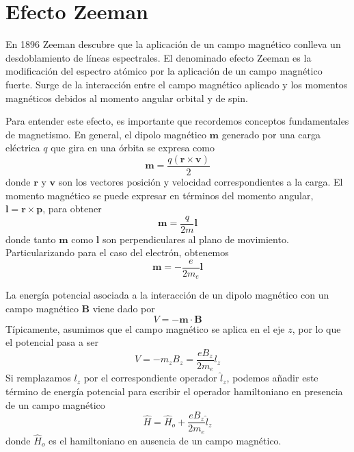 \documentclass{tufte-handout}
\begin{document}

\section{Efecto Zeeman}
En 1896 Zeeman descubre que la aplicación de un campo magnético conlleva un
desdoblamiento de líneas espectrales. El denominado efecto Zeeman es la 
modificación del espectro atómico por la aplicación de un campo magnético
fuerte. Surge de la interacción entre el campo magnético aplicado y los
momentos magnéticos debidos al momento angular orbital y de spin.

Para entender este efecto, es importante
que recordemos conceptos fundamentales de magnetismo. En general, el
dipolo magnético $\mathbf{m}$ generado por una carga eléctrica $q$
que gira en una órbita se expresa como
\begin{equation}
    \mathbf{m}=\frac{q(\mathbf{r}\times\mathbf{v})}{2}
\end{equation}
donde $\mathbf{r}$ y $\mathbf{v}$ son los vectores posición y velocidad
correspondientes a la carga. El momento magnético se puede expresar en
términos del momento angular, $\mathbf{l}=\mathbf{r}\times\mathbf{p}$,
para obtener
\begin{equation}
    \mathbf{m}=\frac{q}{2m}\mathbf{l}
\end{equation}
donde tanto $\mathbf{m}$ como $\mathbf{l}$ son perpendiculares al plano 
de movimiento. Particularizando para el caso del electrón, obtenemos
\begin{equation}
    \mathbf{m}=-\frac{e}{2m_e}\mathbf{l}
\end{equation}

La energía potencial asociada a la interacción de un dipolo magnético 
con un campo magnético $\mathbf{B}$ viene dado por 
\begin{equation}
    V=-\mathbf{m}\cdot\mathbf{B}
\end{equation}
Típicamente, asumimos que el campo magnético se aplica en el eje $z$,
por lo que el potencial pasa a ser
\begin{equation}
    V=-m_zB_z=\frac{eB_z}{2m_e}l_z
\end{equation}
Si remplazamos $l_z$ por el correspondiente operador $\hat{l}_z$,
podemos añadir este término de energía potencial para 
escribir el operador hamiltoniano en presencia de un campo
magnético
\begin{equation}
    \hat{H}=\hat{H}_o + \frac{eB_z}{2m_e}\hat{l}_z
\end{equation}
donde $\hat{H}_o$ es el hamiltoniano en ausencia de un campo
magnético.
\end{document}
